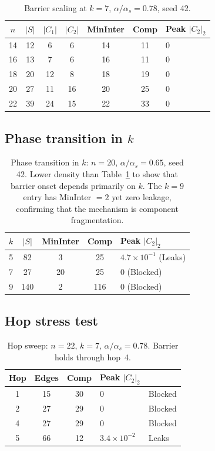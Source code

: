 \documentclass[11pt]{article}
\begin{document}
\begin{table}[ht]
\centering
\caption{Barrier scaling at $k = 7$, $\alpha/\alpha_s = 0.78$, seed 42.}\label{tab:scaling}
\begin{tabular}{@{}ccccccl@{}}
\toprule
$n$ & $|S|$ & $|C_1|$ & $|C_2|$ & MinInter & Comp & Peak $|C_2|_2$ \\
\midrule
14 & 12 & 6 & 6 & 14 & 11 & 0 \\
16 & 13 & 7 & 6 & 16 & 11 & 0 \\
18 & 20 & 12 & 8 & 18 & 19 & 0 \\
20 & 27 & 11 & 16 & 20 & 25 & 0 \\
22 & 39 & 24 & 15 & 22 & 33 & 0 \\
\bottomrule
\end{tabular}
\end{table}


\subsection{Phase transition in $k$}

\begin{table}[ht]
\centering
\caption{Phase transition in $k$: $n = 20$, $\alpha/\alpha_s = 0.65$, seed 42.  Lower density than Table~\ref{tab:scaling} to show that barrier onset depends primarily on $k$.  The $k = 9$ entry has MinInter $= 2$ yet zero leakage, confirming that the mechanism is component fragmentation.}\label{tab:kphase}
\begin{tabular}{@{}ccccl@{}}
\toprule
$k$ & $|S|$ & MinInter & Comp & Peak $|C_2|_2$ \\
\midrule
5 & 82 & 3 & 25 & $4.7 \times 10^{-1}$ (Leaks) \\
7 & 27 & 20 & 25 & 0 (Blocked) \\
9 & 140 & 2 & 116 & 0 (Blocked) \\
\bottomrule
\end{tabular}
\end{table}


\subsection{Hop stress test}

\begin{table}[ht]
\centering
\caption{Hop sweep: $n = 22$, $k = 7$, $\alpha/\alpha_s = 0.78$.  Barrier holds through hop~4.}\label{tab:hop}
\begin{tabular}{@{}cccll@{}}
\toprule
Hop & Edges & Comp & Peak $|C_2|_2$ & \\
\midrule
1 & 15 & 30 & 0 & Blocked \\
2 & 27 & 29 & 0 & Blocked \\
4 & 27 & 29 & 0 & Blocked \\
5 & 66 & 12 & $3.4 \times 10^{-2}$ & Leaks \\
\bottomrule
\end{tabular}
\end{table}
\end{document}
